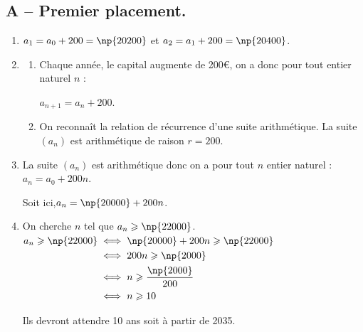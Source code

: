 \subsection*{A -- Premier placement.}
	\begin{enumerate}
		\item $a_{1} = a_0+200 = \np{20200}$ \quad et \quad $a_{2} = a_1 +200 = \np{20400}$.

		\item \begin{enumerate}
			\item Chaque année, le capital augmente de 200\euro{}, on a donc pour tout entier naturel $n$ :

			$a_{n+1}=a_n+200$.

			\item On reconnaît la relation de récurrence d'une suite arithmétique. La suite $(a_n)$ est arithmétique de raison $r=200$.
		\end{enumerate}

		\item La suite $(a_n)$ est arithmétique donc on a pour tout $n$ entier naturel :\quad $a_n=a_0+200n$.

		Soit ici,\quad $a_n=\np{20000} +200n$.

		\item On cherche $n$ tel que $a_n \geqslant  \np{22000}$.\hspace*{2cm}
		$\aligned[t] a_n \geqslant  \np{22000} & \iff \np{20000} +200n \geqslant  \np{22000}\\
		 & \iff 200n \geqslant  \np{2000}\\
		 & \iff n \geqslant \dfrac{\np{2000}}{200} \vspace*{2mm}\\
		 & \iff n \geqslant  10
		\endaligned$

		Ils devront attendre 10 ans soit à partir de 2035.
	\end{enumerate}

